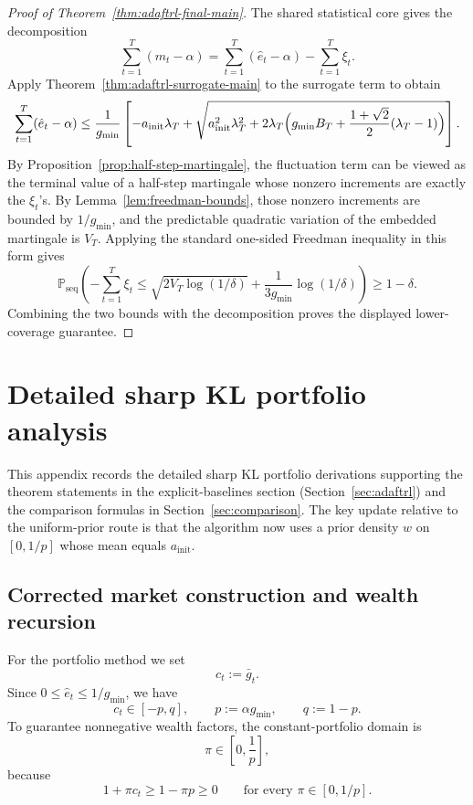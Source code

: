 \documentclass[11pt]{article}
\newcommand{\Prob}{\mathbb{P}}
\newcommand{\1}{\mathbf{1}}
\newcommand{\seq}{\mathrm{seq}}
\begin{document}
\begin{proof}[Proof of Theorem~\ref{thm:adaftrl-final-main}]
The shared statistical core gives the decomposition
\[
\sum_{t=1}^T (m_t-\alpha)
=
\sum_{t=1}^T (\hat e_t-\alpha) - \sum_{t=1}^T \xi_t.
\]
Apply Theorem~\ref{thm:adaftrl-surrogate-main} to the surrogate term to obtain
\[
\sum_{t=1}^T (\hat e_t-\alpha)
\le
\frac{1}{g_{\min}}
\left[
-a_{\mathrm{init}}\lambda_T
+
\sqrt{
a_{\mathrm{init}}^2\lambda_T^2
+
2\lambda_T\Bigl(g_{\min}B_T+\frac{1+\sqrt{2}}{2}(\lambda_T-1)\Bigr)
}
\right].
\]
By Proposition~\ref{prop:half-step-martingale}, the fluctuation term can be viewed as the terminal value of a half-step martingale whose nonzero increments are exactly the \(\xi_t\)'s. By Lemma~\ref{lem:freedman-bounds}, those nonzero increments are bounded by \(1/g_{\min}\), and the predictable quadratic variation of the embedded martingale is \(V_T\). Applying the standard one-sided Freedman inequality in this form gives
\[
\Prob_{\seq}\!\left(
-\sum_{t=1}^T\xi_t
\le
\sqrt{2V_T\log(1/\delta)}
+
\frac{1}{3g_{\min}}\log(1/\delta)
\right)\ge 1-\delta.
\]
Combining the two bounds with the decomposition proves the displayed lower-coverage guarantee.
\end{proof}

\section{Detailed sharp KL portfolio analysis}
\label{app:kl-details}

This appendix records the detailed sharp KL portfolio derivations supporting the theorem statements in the explicit-baselines section (Section~\ref{sec:adaftrl}) and the comparison formulas in Section~\ref{sec:comparison}. The key update relative to the uniform-prior route is that the algorithm now uses a prior density \(w\) on \([0,1/p]\) whose mean equals \(a_{\mathrm{init}}\).

\subsection{Corrected market construction and wealth recursion}

For the portfolio method we set
\[
c_t:=\bar g_t.
\]
Since \(0\le \hat e_t\le 1/g_{\min}\), we have
\[
c_t\in[-p,q],
\qquad
p:=\alpha g_{\min},
\qquad
q:=1-p.
\]
To guarantee nonnegative wealth factors, the constant-portfolio domain is
\[
\pi\in\left[0,\frac{1}{p}\right],
\]
because
\[
1+\pi c_t\ge 1-\pi p\ge 0
\qquad\text{for every }\pi\in[0,1/p].
\]
\end{document}
